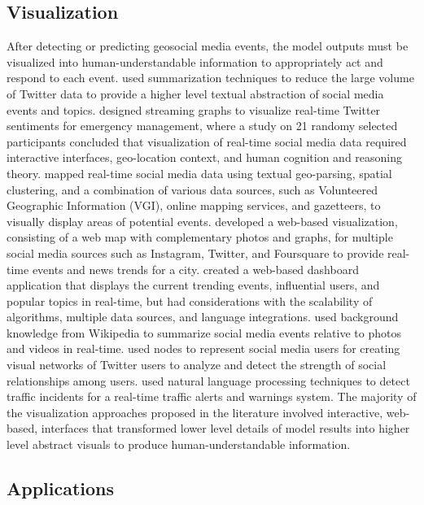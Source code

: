 \subsection{Visualization} \label{visualization}

After detecting or predicting geosocial media events, the model outputs must be visualized into human-understandable information to appropriately act and respond to each event. \cite{Zubiaga:2012} used summarization techniques to reduce the large volume of Twitter data to provide a higher level  textual abstraction of social media events and topics. \cite{Calderon:2014} designed streaming graphs to visualize real-time Twitter sentiments for emergency management, where a study on 21 randomy selected participants concluded that visualization of real-time social media data required interactive interfaces, geo-location context, and human cognition and reasoning theory. \cite{Middleton:2014} mapped real-time social media data using textual geo-parsing, spatial clustering, and a combination of various data sources, such as Volunteered Geographic Information (VGI), online mapping services, and gazetteers, to visually display areas of potential events. \cite{Xia:2014} developed a web-based visualization, consisting of a web map with complementary photos and graphs, for multiple social media sources such as Instagram, Twitter, and Foursquare to provide real-time events and news trends for a city. \cite{Tsirakis:2015} created a web-based dashboard application that displays the current trending events, influential users, and popular topics in real-time, but had considerations with the scalability of algorithms, multiple data sources, and language integrations. \cite{Shah:2015} used background knowledge from Wikipedia to summarize social media events relative to photos and videos in real-time. \cite{Kumar:2016} used nodes to represent social media users for creating visual networks of Twitter users to analyze and detect the strength of social relationships among users. \cite{Wang:2017} used natural language processing techniques to detect traffic incidents for a real-time traffic alerts and warnings system. The majority of the visualization approaches proposed in the literature involved interactive, web-based, interfaces that transformed lower level details of model results into higher level abstract visuals to produce human-understandable information.

\subsection{Applications} \label{applications}

